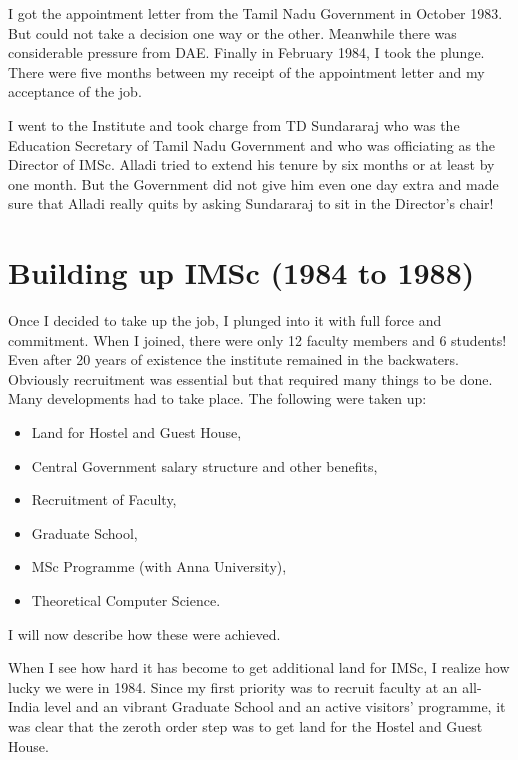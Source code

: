 I got the appointment letter from the Tamil Nadu Government in October 
1983. But could not take a decision one way or the other. Meanwhile 
there was considerable pressure from DAE. Finally in February 1984, I 
took the plunge. There were five months between my receipt of the 
appointment letter and my acceptance of the job.

I went to the Institute and took charge from TD Sundararaj who was the 
Education Secretary of Tamil Nadu Government and who was officiating as 
the Director of IMSc. Alladi tried to extend his tenure by six months or 
at least by one month. But the Government did not give him even one day 
extra and made sure that Alladi really quits by asking Sundararaj to sit 
in the Director's chair!


\section*{Building up IMSc (1984 to 1988)}

Once I decided to take up the job, I plunged into it with full force and 
commitment. When I joined, there were only 12 faculty members and 6 
students! Even after 20 years of existence the institute remained in the 
backwaters. Obviously recruitment was essential but that required many 
things to be done. Many develop\-ments had to take place. The following 
were taken up:

\begin{itemize}
\itemsep=0pt
\item Land for Hostel and Guest House, 
\item Central Government salary structure and other benefits, 
\item Recruitment of Faculty, 
\item Graduate School, 
\item MSc Programme (with Anna University), 
\item Theoretical Computer Science.
\end{itemize}

I will now describe how these were achieved. 

When I see how hard it has become to get additional land for IMSc, I 
realize how lucky we were in 1984. Since my first priority was to 
recruit faculty at an all-India level and an vibrant Gra\-duate School and 
an active visitors' programme, it was clear that the zeroth order step 
was to get land for the Hostel and Guest House.

